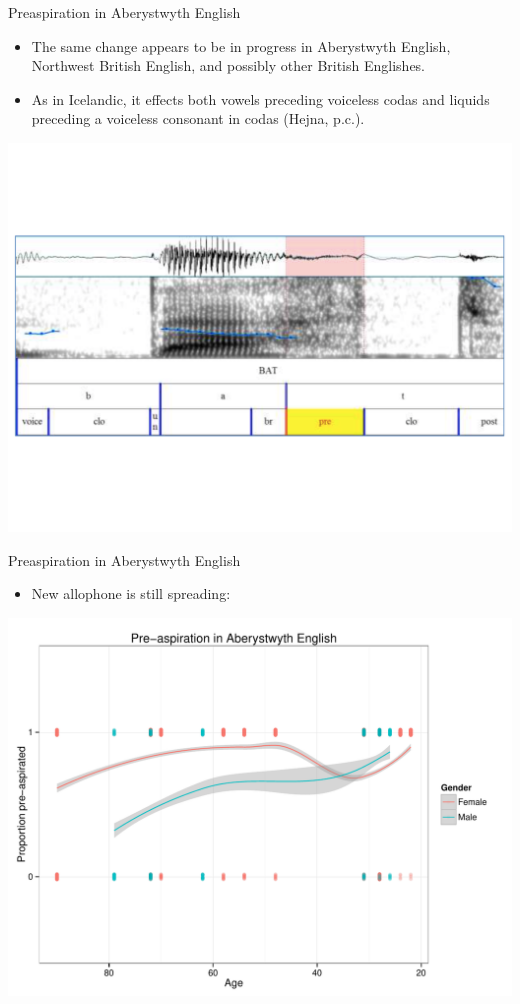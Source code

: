 \documentclass[hyperref={pdfpagelabels=false}]{beamer}
\begin{document}
\begin{frame}{Preaspiration in Aberystwyth English \citep{Hejna2014}}
\begin{itemize}
\item The same change appears to be in progress in Aberystwyth English, Northwest British English, and possibly other British Englishes.
\item As in Icelandic, it effects both vowels preceding voiceless codas and liquids preceding a voiceless consonant in codas (Hejna, p.c.).
\end{itemize}
\begin{center}

\includegraphics[trim=2cm 2cm 2cm 5cm, clip=true, width=.85\textwidth]{PreaspEx.pdf}
\end{center}
\end{frame}

\begin{frame}{Preaspiration in Aberystwyth English \citep{Hejna2014}}
\begin{itemize}
\item New allophone is still spreading: \end{itemize}

\begin{center}
\includegraphics[width=.85\textwidth]{misaplot.pdf}
\end{center}
\end{frame}
\end{document}
